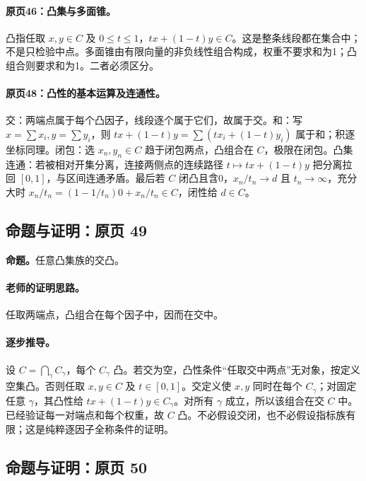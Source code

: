 \documentclass[11pt,a4paper]{article}
\theoremstyle{definition}\newtheorem{definition}{定义}\newtheorem{example}{例}
\begin{document}
\paragraph{原页46：凸集与多面锥。}凸指任取 $x,y\in C$ 及 $0\le t\le1$，$tx+(1-t)y\in C$。这是整条线段都在集合中；不是只检验中点。多面锥由有限向量的非负线性组合构成，权重不要求和为1；凸组合则要求和为1。二者必须区分。



\paragraph{原页48：凸性的基本运算及连通性。}交：两端点属于每个凸因子，线段逐个属于它们，故属于交。和：写 $x=\sum x_i,y=\sum y_i$，则 $tx+(1-t)y=\sum(tx_i+(1-t)y_i)$ 属于和；积逐坐标同理。闭包：选 $x_n,y_n\in C$ 趋于闭包两点，凸组合在 $C$，极限在闭包。凸集连通：若被相对开集分离，连接两侧点的连续路径 $t\mapsto tx+(1-t)y$ 把分离拉回 $[0,1]$，与区间连通矛盾。最后若 $C$ 闭凸且含0，$x_n/t_n\to d$ 且 $t_n\to\infty$，充分大时 $x_n/t_n=(1-1/t_n)0+x_n/t_n\in C$，闭性给 $d\in C$。



\subsection{命题与证明：原页 49}

\textbf{命题。}任意凸集族的交凸。

\paragraph{老师的证明思路。}任取两端点，凸组合在每个因子中，因而在交中。

\paragraph{逐步推导。}
设 $C=\bigcap_\gamma C_\gamma$，每个 $C_\gamma$ 凸。若交为空，凸性条件“任取交中两点”无对象，按定义空集凸。否则任取 $x,y\in C$ 及 $t\in[0,1]$。交定义使 $x,y$ 同时在每个 $C_\gamma$；对固定任意 $\gamma$，其凸性给 $tx+(1-t)y\in C_\gamma$。对所有 $\gamma$ 成立，所以该组合在交 $C$ 中。
已经验证每一对端点和每个权重，故 $C$ 凸。不必假设交闭，也不必假设指标族有限；这是纯粹逐因子全称条件的证明。


\subsection{命题与证明：原页 50}
\end{document}

